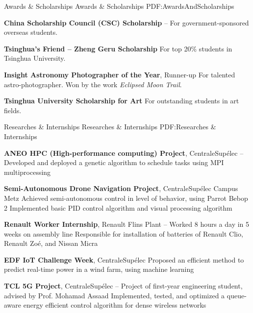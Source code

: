 \documentclass[a4paper,MMMyyyy,nonstopmode]{simpleresumecv}
\begin{document}
\begin{Body}

\Section
{Awards \&\newline
Scholarships}
{Awards \& Scholarships}
{PDF:AwardsAndScholarships}

\Entry
\textbf{China Scholarship Council (CSC) Scholarship}
\hfill
{} --
\Item
For government-sponsored overseas students.

\Gap
\Entry
\textbf{Tsinghua's Friend -- Zheng Geru Scholarship}
\hfill
{}
\Item
For top 20\% students in Tsinghua University.

\Gap
\Entry
\textbf{Insight Astronomy Photographer of the Year}, Runner-up
\hfill
{}
\Item
For talented astro-photographer. Won by the work \textsl{Eclipsed Moon Trail}.

\Gap
\Entry
\textbf{Tsinghua University Scholarship for Art}
\hfill
{}
\Item
For outstanding students in art fields.



\Section
{Researches \& Internships}
{Researches \& Internships}
{PDF:Researches \& Internships}

\Entry
\textbf{ANEO HPC (High-performance computing) Project}, CentraleSupélec
\hfill
{} -- 
\Gap
\BulletItem
Developed and deployed a genetic algorithm to schedule tasks using MPI multiprocessing
\BigGap

\Entry
\textbf{Semi-Autonomous Drone Navigation Project}, CentraleSupélec Campus Metz
\hfill
{}
\Gap
\BulletItem
Achieved semi-autonomous control in level of behavior, using Parrot Bebop 2
\BulletItem
Implemented basic PID control algorithm and visual processing algorithm
\BigGap

\Entry
\textbf{Renault Worker Internship}, Renault Flins Plant
\hfill
{} -- 
\Gap
\BulletItem
Worked 8 hours a day in 5 weeks on assembly line
\BulletItem
Responsible for installation of batteries of Renault Clio, Renault Zoé, and Nissan Micra
\BigGap

\Entry
\textbf{EDF IoT Challenge Week}, CentraleSupélec
\hfill
{}
\Gap
\BulletItem
Proposed an efficient method to predict real-time power in a wind farm, using machine learning
\BigGap

\Entry
\textbf{TCL 5G Project}, CentraleSupélec
\hfill
{} -- 
\Gap
\BulletItem
Project of first-year engineering student, advised by Prof. Mohamad Assaad
\BulletItem
Implemented, tested, and optimized a queue-aware energy efficient control algorithm for dense wireless networks
\BigGap


\end{Body}
\end{document}
